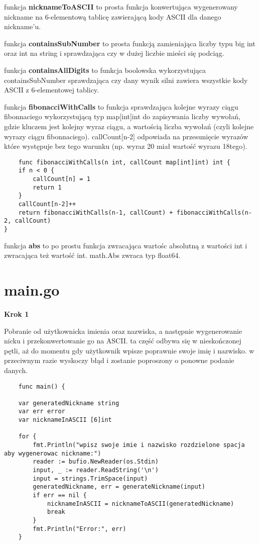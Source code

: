 \documentclass{article}
\begin{document}
funkcja \textbf{nicknameToASCII} to prosta funkcja konwertująca wygenerowany nickname na 6-elementową tablicę zawierającą kody ASCII dla danego nickname'u.

funkcja \textbf{containsSubNumber} to prosta funkcją zamieniająca liczby typu big int oraz int na string i sprawdzająca czy w dużej liczbie mieści się podciąg.

funkcja \textbf{containsAllDigits} to funkcja boolowska wykorzystująca containsSubNumber sprawdzająca czy dany wynik silni zawiera wszystkie kody ASCII z 6-elementowej tablicy. 

funkcja \textbf{fibonacciWithCalls} to funkcja sprawdzająca kolejne wyrazy ciągu fibonnaciego wykorzystującą typ map[int]int do zapisywania liczby wywołań, gdzie kluczem jest kolejny wyraz ciągu, a wartością liczba wywołań (czyli kolejne wyrazy ciągu fibonnaciego). callCount[n-2] odpowiada na przesunięcie wyrazów które występuje bez tego warunku (np. wyraz 20 miał wartość wyrazu 18tego).

\begin{lstlisting}
    func fibonacciWithCalls(n int, callCount map[int]int) int {
	if n < 0 {
		callCount[n] = 1
		return 1
	}
	callCount[n-2]++
	return fibonacciWithCalls(n-1, callCount) + fibonacciWithCalls(n-2, callCount)
}
\end{lstlisting}

funkcja \textbf{abs} to po prostu funkcja zwracająca wartośc absolutną z wartości int i zwracająca też wartość int. math.Abs zwraca typ float64.

\section{main.go}

\textbf{Krok 1}

Pobranie od użytkownicka imienia oraz nazwiska, a następnie wygenerowanie nicku i przekonwertowanie go na ASCII. ta część odbywa się w nieskończonej pętli, aż do momentu gdy użytkownik wpisze poprawnie swoje imię i nazwisko. w przeciwnym razie wyskoczy błąd i zostanie poproszony o ponowne podanie danych.

\begin{lstlisting}
    func main() {

	var generatedNickname string
	var err error
	var nicknameInASCII [6]int

	for {
		fmt.Println("wpisz swoje imie i nazwisko rozdzielone spacja aby wygenerowac nickname:")
		reader := bufio.NewReader(os.Stdin)
		input, _ := reader.ReadString('\n')
		input = strings.TrimSpace(input)
		generatedNickname, err = generateNickname(input)
		if err == nil {
			nicknameInASCII = nicknameToASCII(generatedNickname)
			break
		}
		fmt.Println("Error:", err)
	}
\end{lstlisting}
\end{document}
